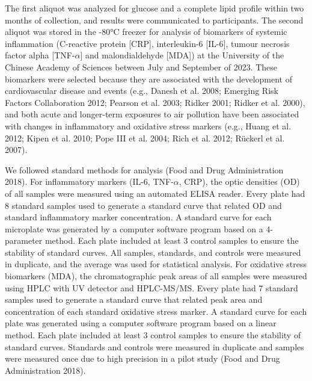 \documentclass[
  letterpaper,
  DIV=11,
  numbers=noendperiod]{scrartcl}
\providecommand{\DIFadd}[1]{{\protect\color{blue}\uwave{#1}}} %
\providecommand{\DIFaddbegin}{} %
\providecommand{\DIFaddend}{} %
\providecommand{\DIFdelbegin}{} %
\providecommand{\DIFdelend}{} %
\newcommand{\DIFscaledelfig}{0.5}
\newlength{\DIFdelgraphicswidth} %
\newlength{\DIFdelgraphicsheight} %
\newcommand{\DIFaddincludegraphics}[2][]{{\color{blue}\fbox{\DIFOincludegraphics[#1]{#2}}}} %
\newcommand{\DIFdelincludegraphics}[2][]{%
\sbox{\DIFdelgraphicsbox}{\DIFOincludegraphics[#1]{#2}}%
\settoboxwidth{\DIFdelgraphicswidth}{\DIFdelgraphicsbox} %
\settoboxtotalheight{\DIFdelgraphicsheight}{\DIFdelgraphicsbox} %
\scalebox{\DIFscaledelfig}{%
\parbox[b]{\DIFdelgraphicswidth}{\usebox{\DIFdelgraphicsbox}\\[-\baselineskip] \rule{\DIFdelgraphicswidth}{0em}}\llap{\resizebox{\DIFdelgraphicswidth}{\DIFdelgraphicsheight}{%
\setlength{\unitlength}{\DIFdelgraphicswidth}%
\begin{picture}(1,1)%
\thicklines\linethickness{2pt} %
{\color[rgb]{1,0,0}\put(0,0){\framebox(1,1){}}}%
{\color[rgb]{1,0,0}\put(0,0){\line( 1,1){1}}}%
{\color[rgb]{1,0,0}\put(0,1){\line(1,-1){1}}}%
\end{picture}%
}\hspace*{3pt}}} %
} %
\DeclareRobustCommand{\DIFaddbegin}{\DIFOaddbegin \let\includegraphics\DIFaddincludegraphics} %
\DeclareRobustCommand{\DIFaddend}{\DIFOaddend \let\includegraphics\DIFOincludegraphics} %
\DeclareRobustCommand{\DIFdelbegin}{\DIFOdelbegin \let\includegraphics\DIFdelincludegraphics} %
\DeclareRobustCommand{\DIFdelend}{\DIFOaddend \let\includegraphics\DIFOincludegraphics} %
\begin{document}
The first aliquot was analyzed for glucose and a complete lipid profile
within two months of collection, and results were communicated to
participants. The second aliquot was stored in the -80°C freezer for
analysis of biomarkers of systemic inflammation (C-reactive protein
{[}CRP{]}, interleukin-6 {[}IL-6{]}, tumour necrosis factor alpha
{[}TNF-\(\alpha\){]} and malondialdehyde {[}MDA{]}) at the University of
the Chinese Academy of Sciences between July and September of 2023.
These biomarkers were selected because they are associated with the
development of cardiovascular disease and events (e.g., Danesh et al.
2008; Emerging Risk Factors Collaboration 2012; Pearson et al. 2003;
Ridker 2001; Ridker et al. 2000), and both acute and longer-term
exposures to air pollution have been associated with changes in
inflammatory and oxidative stress markers (e.g., Huang et al. 2012;
Kipen et al. 2010; Pope III et al. 2004; Rich et al. 2012; Rückerl et
al. 2007).

We followed standard methods for analysis (Food and Drug Administration
2018). For inflammatory markers (IL-6, TNF-\(\alpha\), CRP), the optic
densities (OD) of all samples were measured using an automated ELISA
reader. Every plate had 8 standard samples used to generate a standard
curve that related OD and standard inflammatory marker concentration. A
standard curve for each microplate was generated by a computer software
program based on a 4-parameter method. Each plate included at least 3
control samples to ensure the stability of standard curves. All samples,
standards, and controls were measured in duplicate, and the average was
used for statistical analysis. For oxidative stress biomarkers (MDA),
the chromatographic peak areas of all samples were measured using HPLC
with UV detector and HPLC-MS/MS. Every plate had 7 standard samples used
to generate a standard curve that related peak area and concentration of
each standard oxidative stress marker. A standard curve for each plate
was generated using a computer software program based on a linear
method. Each plate included at least 3 control samples to ensure the
stability of standard curves. Standards and controls were measured in
duplicate and samples were measured once due to high precision in a
pilot study (Food and Drug Administration 2018).

\DIFdelbegin %
\DIFdelend \DIFaddbegin \subsubsection{\DIFadd{Anthropometric
measurements.}}\label{anthropometric-measurements.}
\DIFaddend 
\end{document}
